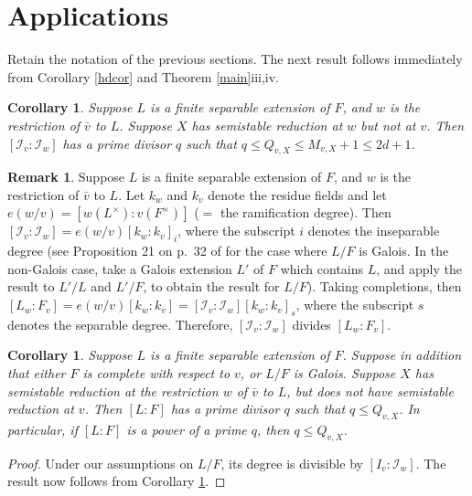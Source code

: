 \documentclass{amsart}
\def\I{{\mathcal I}}
\newtheorem{cor}[thm]{Corollary}
\theoremstyle{definition}
\newtheorem{rem}[thm]{Remark}
\begin{document}
\section{Applications}
\label{applic}

Retain the notation of the previous sections. 
The next result follows immediately from 
Corollary \ref{hdcor} and Theorem \ref{main}iii,iv. 

\begin{cor}
\label{boundcor}
Suppose $L$ is a finite separable extension of $F$, and 
$w$ is the restriction of ${\bar v}$ to $L$. 
Suppose $X$ has semistable reduction at $w$ but not at $v$.
Then $[\I_{v}:\I_{w}]$ has a prime divisor $q$ such that 
$q \le Q_{v,X} \le M_{v,X} + 1 \le 2d + 1$.
\end{cor}

\begin{rem}
\label{divby}
Suppose $L$ is a finite separable extension of $F$, and
$w$ is the restriction of ${\bar v}$ to $L$.
Let $k_{w}$ and $k_{v}$ denote the residue fields and
let $e(w/v) = [w(L^\times):v(F^\times)]$ 
($=$ the ramification degree).
Then $[\I_{v}:\I_{w}] = e(w/v)[k_{w}:k_{v}]_{i}$, where
the subscript $i$ denotes the inseparable degree (see
Proposition 21 on p.~32 of \cite {Corps} for the case where
$L/F$ is Galois. In the non-Galois case, take a Galois extension
$L'$ of $F$ which contains $L$, and apply the result to
$L'/L$ and $L'/F$, to obtain the result for $L/F$).
Taking completions, then $[L_{w}:F_{v}] = e(w/v)[k_{w}:k_{v}]
= [\I_{v}:\I_{w}][k_{w}:k_{v}]_{s}$, where
the subscript $s$ denotes the separable degree.
Therefore, $[\I_{v}:\I_{w}]$ divides $[L_{w}:F_{v}]$.
\end{rem}

\begin{cor}
\label{prpow}
Suppose $L$ is a finite separable extension of $F$. 
Suppose in addition
that either $F$ is complete with respect to $v$,
or $L/F$ is Galois.
Suppose $X$ has semistable reduction at the restriction $w$  
of ${\bar v}$ to $L$, but does not have semistable reduction at $v$.
Then $[L:F]$ has a prime divisor $q$ such that $q \le Q_{v,X}$.
In particular, if $[L:F]$ is a power of a prime $q$, then 
$q \le Q_{v,X}$.
\end{cor}

\begin{proof}
Under our assumptions on $L/F$, its degree  
is divisible by $[I_{v}:\I_{w}]$. The result now follows from
Corollary \ref{boundcor}.
\end{proof}
\end{document}
